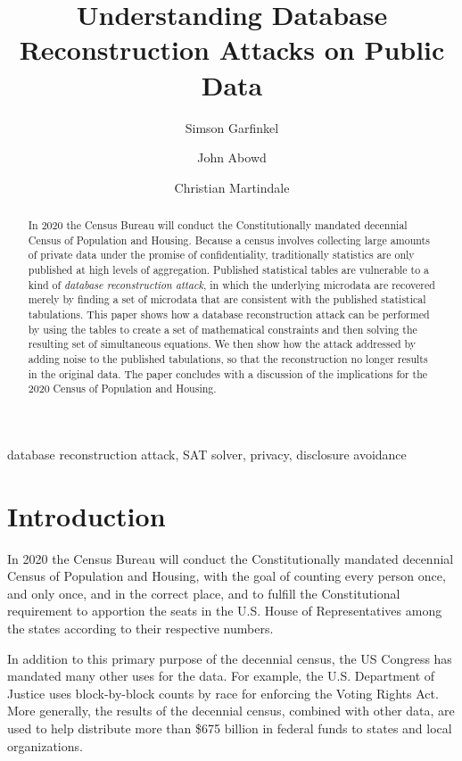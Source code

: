 \documentclass[runningheads]{llncs}
\begin{document}
\title{Understanding Database Reconstruction Attacks on Public Data}
\author{Simson Garfinkel \and John Abowd \and Christian Martindale }

\maketitle
\begin{abstract}
In 2020 the Census Bureau will conduct the Constitutionally mandated
decennial Census of Population and Housing. Because a census involves
collecting large amounts of private data under the promise of
confidentiality, traditionally statistics are only published at high
levels of aggregation.  Published statistical tables are vulnerable
to a kind of \emph{database reconstruction attack}, in which the
underlying microdata are recovered merely by finding a set of
microdata that are consistent with the published statistical
tabulations. This paper shows how a database reconstruction attack can
be performed by using the tables to create a set of mathematical
constraints and then solving the resulting set of simultaneous
equations.  We then show how the attack addressed by adding noise to
the published tabulations, so that the reconstruction no longer results
in the original data. The paper concludes with a discussion of the
implications for the 2020 Census of Population and Housing.
\end{abstract}

\begin{keywords}
database reconstruction attack, SAT solver, privacy, disclosure avoidance
\end{keywords}

\section{Introduction}
In 2020 the Census Bureau will conduct the Constitutionally mandated
decennial Census of Population and Housing, with the goal of counting
every person once, and only once, and in the correct place, and to
fulfill the Constitutional requirement to apportion the seats in the
U.S. House of Representatives among the states according to their
respective numbers.

In addition to this primary purpose of the decennial census, the
US Congress has mandated many other uses for the data. For
example, the U.S. Department of Justice uses block-by-block counts by
race for enforcing the Voting Rights Act. More generally, the results
of the decennial census, combined with other data, are used to help
distribute more than \$675 billion in federal funds to states and
local organizations.
\end{document}
